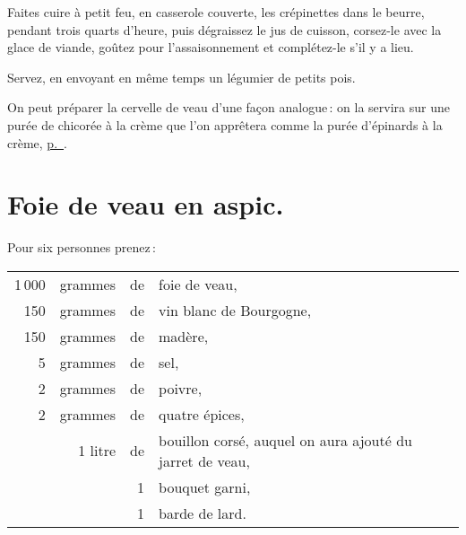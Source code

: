 Faites cuire à petit feu, en casserole couverte, les crépinettes dans le
beurre, pendant trois quarts d'heure, puis dégraissez le jus de cuisson,
corsez-le avec la glace de viande, goûtez pour l'assaisonnement et complétez-le
s'il y a lieu.

Servez, en envoyant en même temps un légumier de petits pois.

\sk

On peut préparer la cervelle de veau d'une façon analogue : on la servira sur
une purée de chicorée à la crème que l'on apprêtera comme la purée d'épinards à
la crème, \hyperlink{p0745}{p. \pageref{pg0745}}.

\section*{\centering Foie de veau en aspic.}
{}

Pour six personnes prenez :

\medskip

\footnotesize
\begin{longtable}{rrrp{18em}}
  1 000 & grammes & de & foie de veau,                                                                    \\
    150 & grammes & de & vin blanc de Bourgogne,                                                          \\
    150 & grammes & de & madère,                                                                          \\
      5 & grammes & de & sel,                                                                             \\
      2 & grammes & de & poivre,                                                                          \\
      2 & grammes & de & quatre épices,                                                                   \\
        & 1 litre & de & bouillon corsé, auquel on aura ajouté du jarret de veau,                         \\
        &         &  1 & bouquet garni,                                                                   \\
        &         &  1 & barde de lard.                                                                   \\
\end{longtable}
\normalsize

